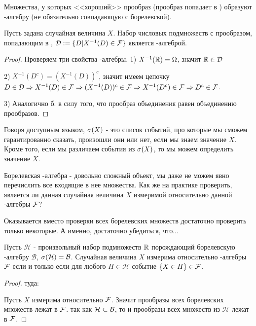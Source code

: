 {Множества, у которых <<хороший>> прообраз (прообраз попадает в \F) образуют \s-алгебру (не обязательно совпадающую с борелевской).
\begin{myth} Пусть задана случайная величина $X$. Набор числовых подмножеств с прообразом, попадающим в \F, $\mathcal{D}:=\{D|X^{-1}(D)\in\mathcal{F}\}$ является \s-алгеброй.
\end{myth}
\begin{proof} Проверяем три свойства \s-алгебры.
1) $X^{-1}(\mathbb R)=\Omega$, значит $\mathbb R\in\mathcal{D}$

2) $X^{-1}(D^{c})=(X^{-1}(D))^{c}$, значит имеем цепочку $D\in\mathcal{D}\Rightarrow X^{-1}(D)\in\mathcal{F} \Rightarrow (X^{-1}(D))^{c}\in\mathcal{F} \Rightarrow X^{-1}(D^{c})\in\mathcal{F} \Rightarrow D^{c}\in\mathcal{F}$.

3) Аналогично б. в силу того, что прообраз объединения равен объединению прообразов.

\end{proof}








Говоря доступным языком, $\sigma(X)$ - это список событий, про которые мы сможем гарантированно сказать, произошли они или нет, если мы знаем значение $X$. Кроме того, если мы различаем события из $\sigma(X)$, то мы можем определить значение $X$.


Борелевская \s-алгебра - довольно сложный объект, мы даже не можем явно перечислить все входящие в нее множества. Как же на практике проверить, является ли данная случайная величина $X$ измеримой относительно данной \s-алгебры $\mathcal{F}$?

Оказывается вместо проверки всех борелевских множеств достаточно проверить только некоторые. А именно, достаточно убедиться, что...

\begin{myth}
Пусть $\mathcal{H}$ - произвольный набор подмножеств $\mathbb R$ порождающий борелевскую \s-алгебру $\mathcal{B}$, $\sigma(\mathcal{H})=\mathcal{B}$. Случайная величина $X$ измерима относительно \s-алгебры $\mathcal{F}$ если и только если для любого $H\in\mathcal{H}$ событие $\{X\in H\}\in\mathcal{F}$.
\end{myth}
\begin{proof}

туда:

Пусть $X$ измерима относительно $\mathcal{F}$. Значит прообразы всех борелевских множеств лежат в $\mathcal{F}$.  так как $\mathcal{H}\subset \mathcal{B}$, то и прообразы всех множеств из $\mathcal{H}$ лежат в $\mathcal{F}$.


\end{proof}}
